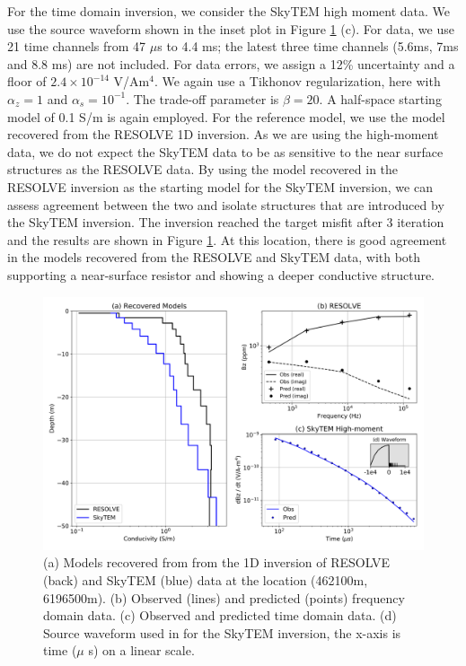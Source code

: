 \documentclass[preprint,review,3p,times,onecolumn,authoryear]{elsarticle}
\begin{document}
For the time domain inversion, we consider the SkyTEM high moment data. We use
the source waveform shown in the inset plot in Figure \ref{fig:booky1D} (c). For
data, we use 21 time channels from 47 $\mu$s to 4.4 ms; the latest three time
channels (5.6ms, 7ms and 8.8 ms) are not included. For data errors, we assign a
12\% uncertainty and a floor of $2.4\times 10^{-14}$ V/Am$^{4}$. We again use
a Tikhonov regularization, here with $\alpha_z = 1$ and $\alpha_s = 10^{-1}$.
The trade-off parameter is $\beta = 20$. A half-space starting model of 0.1
S/m is again employed. For the reference model, we use the model recovered
from the RESOLVE 1D inversion. As we are using the high-moment data, we do not
expect the SkyTEM data to be as sensitive to the near surface structures as
the RESOLVE data. By using the model recovered in the RESOLVE inversion as the
starting model for the SkyTEM inversion, we can assess agreement between the
two and isolate structures that are introduced by the SkyTEM inversion. The
inversion reached the target misfit after 3 iteration and the results are
shown in Figure \ref{fig:booky1D}. At this location, there is good agreement
in the models recovered from the RESOLVE and SkyTEM data, with both supporting
a near-surface resistor and showing a deeper conductive structure.



{%
\begin{figure}[htb!]
    \centering
    \includegraphics[width=\textwidth]{images/booky1D_time_freq.png}
\caption{
    (a) Models recovered from from the 1D inversion of RESOLVE (back) and SkyTEM
    (blue) data at the location (462100m, 6196500m). (b) Observed (lines) and
    predicted (points) frequency domain data. (c) Observed and predicted time
    domain data. (d) Source waveform used in for the SkyTEM inversion, the x-axis
    is time ($\mu$ s) on a linear scale.
}
\label{fig:booky1D}
\end{figure}
}
\end{document}
